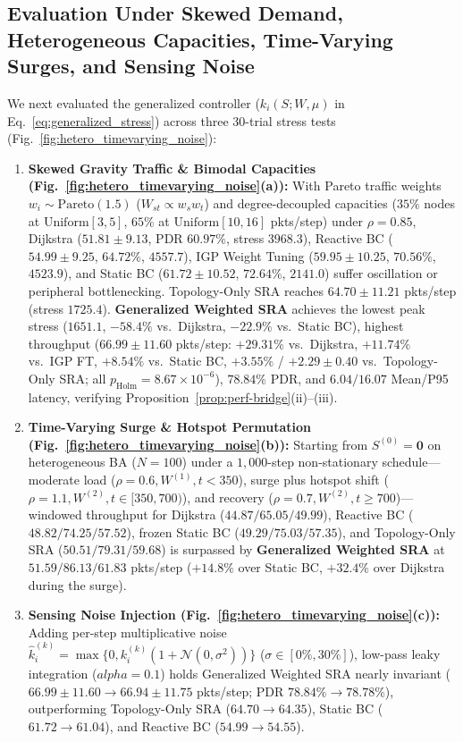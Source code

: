 \documentclass{ccjnl}
\newcommand{\rev}[1]{{\color{blue}#1}}
\def\rev#1{#1}%
\def\widetilde#1{#1}%
\def\kappa{k}%
\def\alpha{alpha}%
\begin{document}
\rev{\subsection{Evaluation Under Skewed Demand, Heterogeneous Capacities, Time-Varying Surges, and Sensing Noise}
\label{subsec:hetero_noise_eval}

We next evaluated the generalized controller ($\widetilde{\kappa}_i(S;W,\mu)$ in Eq.~\eqref{eq:generalized_stress}) across three 30-trial stress tests (Fig.~\ref{fig:hetero_timevarying_noise}):
\begin{enumerate}
    \item \textbf{Skewed Gravity Traffic \& Bimodal Capacities (Fig.~\ref{fig:hetero_timevarying_noise}(a)):} With Pareto traffic weights $w_i \sim \mathrm{Pareto}(1.5)$ ($W_{st} \propto w_s w_t$) and degree-decoupled capacities ($35\%$ nodes at $\mathrm{Uniform}[3, 5]$, $65\%$ at $\mathrm{Uniform}[10, 16]$ pkts/step) under $\rho=0.85$, Dijkstra ($51.81 \pm 9.13$, PDR $60.97\%$, stress $3968.3$), Reactive BC ($54.99 \pm 9.25$, $64.72\%$, $4557.7$), IGP Weight Tuning ($59.95 \pm 10.25$, $70.56\%$, $4523.9$), and Static BC ($61.72 \pm 10.52$, $72.64\%$, $2141.0$) suffer oscillation or peripheral bottlenecking. Topology-Only SRA reaches $64.70 \pm 11.21$ pkts/step (stress $1725.4$). \textbf{Generalized Weighted SRA} achieves the lowest peak stress ($\mathbf{1651.1}$, $-58.4\%$ vs.\ Dijkstra, $-22.9\%$ vs.\ Static BC), highest throughput ($\mathbf{66.99 \pm 11.60}$ pkts/step: $+29.31\%$ vs.\ Dijkstra, $+11.74\%$ vs.\ IGP FT, $+8.54\%$ vs.\ Static BC, $+3.55\%$ / $+2.29 \pm 0.40$ vs.\ Topology-Only SRA; all $p_{\text{Holm}} = 8.67 \times 10^{-6}$), $\mathbf{78.84\%}$ PDR, and $6.04/16.07$ Mean/P95 latency, verifying Proposition~\ref{prop:perf-bridge}(ii)--(iii).
    \item \textbf{Time-Varying Surge \& Hotspot Permutation (Fig.~\ref{fig:hetero_timevarying_noise}(b)):} Starting from $S^{(0)}=\mathbf{0}$ on heterogeneous BA ($N=100$) under a $1{,}000$-step non-stationary schedule—moderate load ($\rho=0.6, W^{(1)}, t<350$), surge plus hotspot shift ($\rho=1.1, W^{(2)}, t\in[350,700)$), and recovery ($\rho=0.7, W^{(2)}, t\ge 700$)—windowed throughput for Dijkstra ($44.87/65.05/49.99$), Reactive BC ($48.82/74.25/57.52$), frozen Static BC ($49.29/75.03/57.35$), and Topology-Only SRA ($50.51/79.31/59.68$) is surpassed by \textbf{Generalized Weighted SRA} at $\mathbf{51.59/86.13/61.83}$ pkts/step ($+14.8\%$ over Static BC, $+32.4\%$ over Dijkstra during the surge).
    \item \textbf{Sensing Noise Injection (Fig.~\ref{fig:hetero_timevarying_noise}(c)):} Adding per-step multiplicative noise $\hat{\kappa}_i^{(k)} = \max\{0, \widetilde{\kappa}_i^{(k)}(1 + \mathcal{N}(0, \sigma^2))\}$ ($\sigma \in [0\%, 30\%]$), low-pass leaky integration ($\alpha=0.1$) holds Generalized Weighted SRA nearly invariant ($66.99 \pm 11.60 \to \mathbf{66.94 \pm 11.75}$ pkts/step; PDR $78.84\% \to 78.78\%$), outperforming Topology-Only SRA ($64.70 \to 64.35$), Static BC ($61.72 \to 61.04$), and Reactive BC ($54.99 \to 54.55$).
\end{enumerate}}
\end{document}
